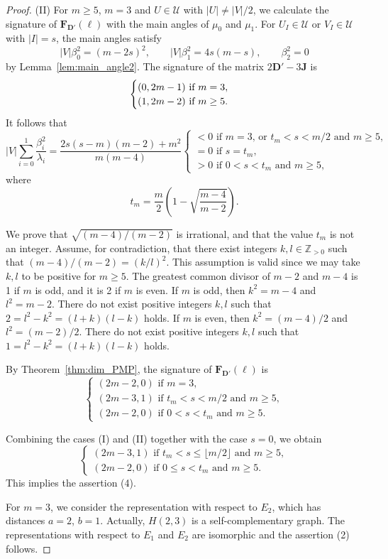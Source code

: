 \documentclass[a4paper, 11pt]{article}
\newcommand{\J}{\boldsymbol{J}}
\newcommand{\D}{\boldsymbol{D}}
\newcommand{\F}{\boldsymbol{F}}
\newcommand{\el}{\boldsymbol{\ell}}
\theoremstyle{definition}
\begin{document}
\begin{proof}
(II) For $m \geq 5$, $m=3$ and $U \in \mathcal{U}$ with $|U|\ne |V|/2$,  we calculate the signature of $\F_{\D'}(\el)$ with the main angles of $\mu_0$ and $\mu_1$. 
For $U_I \in \mathcal{U}$ or $V_I \in \mathcal{U}$ with $|I|=s$, the main angles satisfy  
\[
|V|\beta_0^2=(m-2s)^2, \qquad 
|V|\beta_1^2
=4s(m-s), \qquad
\beta_2^2=0
\] 
by Lemma~\ref{lem:main_angle2}. 
The signature of the matrix $2\D'-3 \J$ is 
\[
\begin{cases}
(0,2m-1) \text{ if $ m=3 $},\\
(1,2m-2) \text{ if $m\geq 5$}.   
\end{cases}
\]
It follows that 
\[
|V|\sum_{i=0}^1\frac{\beta_i^2}{\lambda_i}=
\frac{2s(s-m)(m-2)+m^2}{m(m-4)}\begin{cases}
<0 \text{ if $m=3$, or $t_m<s <  m/2 $ and $m\geq 5$},\\
=0 \text{ if $s=t_m$}, \\
>0 \text{ if $0 <s<t_m$ and $m \geq 5$},  
\end{cases}
\]
where 
\[
t_m=\frac{m}{2}\left(1 - \sqrt{\frac{m-4}{m-2}} \right). 
\]

We prove that $\sqrt{(m-4)/(m-2)}$ is irrational, and that the value $t_m$ is not an integer.
Assume, for contradiction, that there exist integers $k, l \in \mathbb{Z}_{>0}$ such that $(m-4)/(m-2) = (k/l)^2$. This assumption is valid since we may take $k, l$ to be positive for $m \geq 5$. 
The greatest common divisor of $m-2$ and $m-4$ is 1 if $m$ is odd, and it is 2 if $m$ is even.  If $m$ is odd, then $k^2=m-4$ and $l^2=m-2$. 
There do not exist positive integers $k,l$ such that $2=l^2-k^2=(l+k)(l-k)$ holds. 
 If $m$ is even, then $k^2=(m-4)/2$ and $l^2=(m-2)/2$. 
There do not exist positive integers $k,l$ such that $1=l^2-k^2=(l+k)(l-k)$ holds. 

By Theorem~\ref{thm:dim_PMP}, 
the signature of $\F_{\D'}(\el)$ is 
\[
\begin{cases}
(2m-2,0) \text{ if $m =3$},\\
(2m-3,1)\text{ if $t_m<s < m/2 $ and $m\geq 5$},\\
(2m-2,0) \text{ if $0< s<t_m$ and $m \geq 5$}.   
\end{cases}
\]

Combining the cases (I) and (II) together with the case $s=0$, we obtain 
\[
\begin{cases}
(2m-3,1)\text{ if $t_m<s \leq \lfloor m/2 \rfloor $ and $m\geq 5$},\\
(2m-2,0) \text{ if $0\leq  s<t_m$ and $m \geq 5$}.   
\end{cases}
\]
This implies the assertion (4). 

For $m=3$, we consider the representation with respect to $E_2$, which has distances $a=2$, $b=1$. 
Actually, $H(2,3)$ is a self-complementary graph.  
The representations with respect to $E_1$ and $E_2$ are isomorphic and the assertion (2) follows. 
\end{proof}
\end{document}
